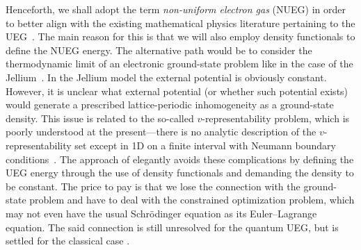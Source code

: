 \documentclass[final,onefignum,onetabnum,reqno]{amsart}
\theoremstyle{remark}
\begin{document}
Henceforth, we shall adopt the term \emph{non-uniform electron gas} (NUEG) in order to better align with the existing mathematical physics literature pertaining to the UEG~\cite{lewin2018statistical}. The main reason for this is that we will also employ density functionals to define the NUEG energy. The alternative path would be to consider the thermodynamic limit of an electronic ground-state problem like in the case of the Jellium~\cite{lieb1975thermodynamic}. In the Jellium model the external potential is obviously constant. However, it is unclear what external potential (or whether such potential exists) would generate a prescribed lattice-periodic inhomogeneity as a ground-state density. This issue is related to the so-called $v$-representability problem, which is poorly understood at the present---there is no analytic description of the $v$-representability set except in 1D on a finite interval with Neumann boundary conditions~\cite{Corso2026,corso-lae2025}.
The approach of \cite{lewin2018statistical} elegantly avoids these complications by defining the UEG energy through the use of density functionals and demanding the density to be constant. 
The price to pay is that we lose the connection with the ground-state problem and have to deal with the constrained optimization problem, which may not even have the usual Schr\"odinger equation as its Euler--Lagrange equation. The said connection is still unresolved for the quantum UEG, but is settled for the classical case \cite{cotar2017equality,lewin2019floating}.
\end{document}
